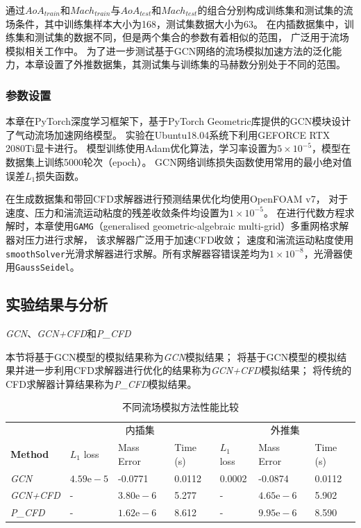 通过${AoA}_{train}$和${Mach}_{train}$与${AoA}_{test}$和${Mach}_{test}$的组合分别构成训练集和测试集的流场条件，其中训练集样本大小为168，测试集数据大小为63。
在内插数据集中，训练集和测试集的数据不同，但是两个集合的参数有着相似的范围，
广泛用于流场模拟相关工作中\cite{bhatnagar2019prediction,DBLP:conf/kdd/GuoLI16}。
为了进一步测试基于GCN网络的流场模拟加速方法的泛化能力，本章设置了外推数据集，其测试集与训练集的马赫数分别处于不同的范围。



\subsubsection{参数设置}
本章在PyTorch深度学习框架下，基于PyTorch Geometric库提供的GCN模块设计了气动流场加速网络模型。
实验在Ubuntu18.04系统下利用GEFORCE RTX 2080Ti显卡进行。
模型训练使用Adam优化算法，学习率设置为$5\times10^{-5}$，模型在数据集上训练5000轮次（epoch）。
GCN网络训练损失函数使用常用的最小绝对值误差$L_1$损失函数。

在生成数据集和带回CFD求解器进行预测结果优化均使用OpenFOAM v7，
对于速度、压力和湍流运动粘度的残差收敛条件均设置为$1\times10^{-5}$。
在进行代数方程求解时，本章使用\texttt{GAMG}（generalised geometric-algebraic multi-grid）多重网格求解器对压力进行求解，
该求解器广泛用于加速CFD收敛；
速度和湍流运动粘度使用\texttt{smoothSolver}光滑求解器进行求解。所有求解器容错误差均为$1\times10^{-8}$，光滑器使用\texttt{GaussSeidel}。


\subsection{实验结果与分析}

\textit{GCN}、\textit{GCN+CFD}和\textit{P\_CFD}

本节将基于GCN模型的模拟结果称为\textit{GCN}模拟结果；
将基于GCN模型的模拟结果并进一步利用CFD求解器进行优化的结果称为\textit{GCN+CFD}模拟结果；
将传统的CFD求解器计算结果称为\textit{P\_CFD}模拟结果。

\begin{table}[htp]
	\caption{不同流场模拟方法性能比较}
	
	\label{tab:gcn_comp}
	\centering
	
	\begin{tabular}{p{2.2cm}p{1.5cm}p{1.8cm}p{1.4cm}|p{1.5cm}p{1.8cm}p{1.4cm}}
		\toprule
		& \multicolumn{3}{c|}{内插集} & \multicolumn{3}{c}{外推集} \\
		\textbf{Method} &  $L_1$ loss	&	Mass Error &	Time (s)&	$L_1$ loss	&	Mass Error &	Time (s)\\
		\midrule
		
		\textit{GCN}   &	$4.59 \mathrm{e}-5$ &	-0.0771  &	0.0112&	0.0002	&    -0.0874	& 	0.0112\\
		\textit{GCN+CFD}  & 	-	&	$3.80 \mathrm{e}-6$ &	5.277 &	- &	$4.65 \mathrm{e}-6$	& 5.902  \\
		\textit{P\_CFD}  & 	-	&	$1.62 \mathrm{e}-6$ &	8.612 &	- &	$9.95 \mathrm{e}-6$	& 8.590 \\
		\bottomrule
	\end{tabular}
	
\end{table}

